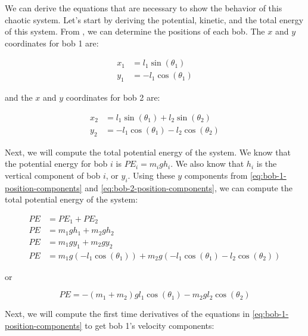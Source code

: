 We can derive the equations that are necessary to show the behavior of this chaotic system. Let's start by deriving the potential, kinetic, and the total energy of this system. From , we can determine the positions of each bob. The $x$ and $y$ coordinates for bob 1 are:

\begin{equation}
    \begin{aligned}
        x_1 &= l_1\sin\left(\theta_1\right)\\
        y_1 &= -l_1\cos\left(\theta_1\right)
    \end{aligned}
    \label{eq:bob-1-position-components}
\end{equation}

and the $x$ and $y$ coordinates for bob 2 are:

\begin{equation}
    \begin{aligned}
        x_2 &= l_1\sin\left(\theta_1\right) + l_2\sin\left(\theta_2\right)\\
        y_2 &= -l_1\cos\left(\theta_1\right) - l_2\cos\left(\theta_2\right)
    \end{aligned}
    \label{eq:bob-2-position-components}
\end{equation}

Next, we will compute the total potential energy of the system. We know that the potential energy for bob $i$ is $PE_i = m_i g h_i$. We also know that $h_i$ is the vertical component of bob $i$, or $y_i$. Using these $y$ components from \eqref{eq:bob-1-position-components} and \eqref{eq:bob-2-position-components}, we can compute the total potential energy of the system:

\begin{align*}
    PE &= PE_1 + PE_2\\
    PE &= m_1gh_1 + m_2gh_2\\
    PE &= m_1gy_1 + m_2gy_2\\
    PE &= m_1g\left(-l_1\cos\left(\theta_1\right)\right) + m_2g\left(-l_1\cos\left(\theta_1\right) - l_2\cos\left(\theta_2\right)\right)
\end{align*}

or 

\begin{equation}
    PE = -\left(m_1 + m_2\right)gl_1\cos\left(\theta_1\right) - m_2gl_2\cos\left(\theta_2\right)
    \label{eq:potential-energy}
\end{equation}

Next, we will compute the first time derivatives of the equations in \eqref{eq:bob-1-position-components} to get bob 1's velocity components:

